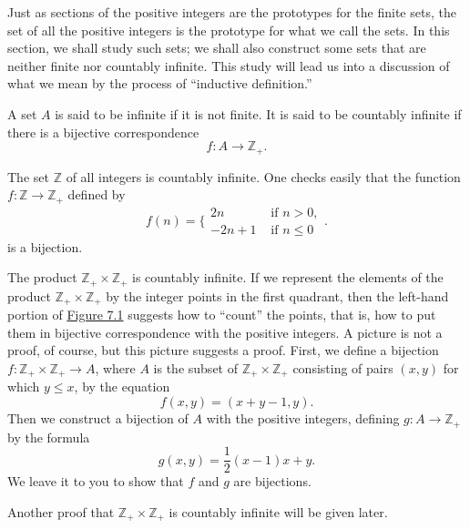 
Just as sections of the positive integers are the prototypes for the finite sets, the set of all the positive integers is the prototype for what we call the  sets. In this section, we shall study such sets; we shall also construct some sets that are neither finite nor countably infinite. This study will lead us into a discussion of what we mean by the process of ``inductive definition.''

\begin{definition}
 A set \(A\) is said to be infinite if it is not finite. It is said to be countably infinite if there is a bijective correspondence
 \[
 f : A \rightarrow {\mathbb{Z}}_{+}\text{.}
 \]
\end{definition}

\begin{centeredblock}
 \begin{example}
\label{ex:\thesection.\theexample}
 The set \(\mathbb{Z}\) of all integers is countably infinite. One checks easily that the function \(f : \mathbb{Z} \rightarrow {\mathbb{Z}}_{+}\) defined by
 \[
 f(n) = \{ \begin{array}{ll} {2n} & \text{ if }n > 0, \\ - {2n} + 1 & \text{ if }n \leq 0 \end{array}.
 \]
 is a bijection.
 \end{example}
\end{centeredblock}

\begin{centeredblock}
 \begin{example}
\label{ex:\thesection.\theexample}
 The product \(\mathbb{Z}_{+} \times {\mathbb{Z}}_{+}\) is countably infinite. If we represent the elements of the product \(\mathbb{Z}_{+} \times {\mathbb{Z}}_{+}\) by the integer points in the first quadrant, then the left-hand portion of \hyperref[fig:7.1]{Figure 7.1} suggests how to ``count'' the points, that is, how to put them in bijective correspondence with the positive integers. A picture is not a proof, of course, but this picture suggests a proof. First, we define a bijection \(f : \mathbb{Z}_{+} \times {\mathbb{Z}}_{+} \rightarrow A\), where \(A\) is the subset of \(\mathbb{Z}_{+} \times {\mathbb{Z}}_{+}\) consisting of pairs \((x, y)\) for which \(y \leq x\), by the equation
 \[
 f({x,y}) = ({x + y - 1,y}).
 \]
 Then we construct a bijection of \(A\) with the positive integers, defining \(g : A \rightarrow {\mathbb{Z}}_{+}\) by the formula
 \[
 g({x,y}) = \frac{1}{2}({x - 1}) x + y.
 \]
 We leave it to you to show that \(f\) and \(g\) are bijections.
 
 Another proof that \(\mathbb{Z}_{+} \times {\mathbb{Z}}_{+}\) is countably infinite will be given later.
 \end{example}
\end{centeredblock}

